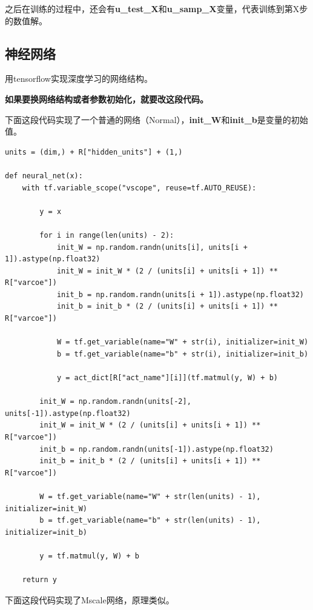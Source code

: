\documentclass[12pt,a4paper]{article}
\begin{document}
之后在训练的过程中，还会有\textbf{u\_test\_X}和\textbf{u\_samp\_X}变量，代表训练到第X步的数值解。

\subsection*{神经网络}

用tensorflow实现深度学习的网络结构。

\textbf{如果要换网络结构或者参数初始化，就要改这段代码。}

下面这段代码实现了一个普通的网络（Normal），\textbf{init\_W}和\textbf{init\_b}是变量的初始值。

\begin{lstlisting}
units = (dim,) + R["hidden_units"] + (1,)

def neural_net(x):
    with tf.variable_scope("vscope", reuse=tf.AUTO_REUSE):

        y = x

        for i in range(len(units) - 2):
            init_W = np.random.randn(units[i], units[i + 1]).astype(np.float32)
            init_W = init_W * (2 / (units[i] + units[i + 1]) ** R["varcoe"])
            init_b = np.random.randn(units[i + 1]).astype(np.float32)
            init_b = init_b * (2 / (units[i] + units[i + 1]) ** R["varcoe"])

            W = tf.get_variable(name="W" + str(i), initializer=init_W)
            b = tf.get_variable(name="b" + str(i), initializer=init_b)

            y = act_dict[R["act_name"][i]](tf.matmul(y, W) + b)

        init_W = np.random.randn(units[-2], units[-1]).astype(np.float32)
        init_W = init_W * (2 / (units[i] + units[i + 1]) ** R["varcoe"])
        init_b = np.random.randn(units[-1]).astype(np.float32)
        init_b = init_b * (2 / (units[i] + units[i + 1]) ** R["varcoe"])

        W = tf.get_variable(name="W" + str(len(units) - 1), initializer=init_W)
        b = tf.get_variable(name="b" + str(len(units) - 1), initializer=init_b)

        y = tf.matmul(y, W) + b

    return y
\end{lstlisting}

下面这段代码实现了Mscale网络，原理类似。
\end{document}
